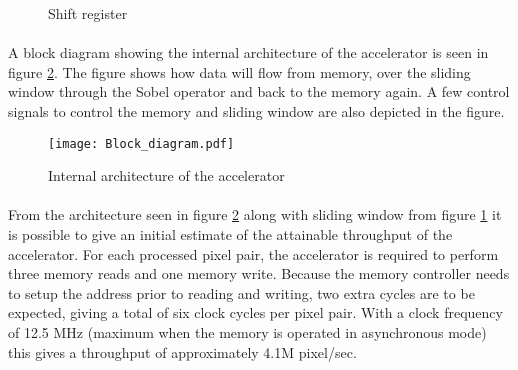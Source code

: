 \begin{figure}[H]
	\centering
	\caption{Shift register}
	\label{fig:shift_register}
\end{figure}

\paragraph*{}
A block diagram showing the internal architecture of the accelerator is seen in figure \ref{fig:AccBlockDiagram}. The figure shows how data will flow from memory, over the sliding window through the Sobel operator and back to the memory again. A few control signals to control the memory and sliding window are also depicted in the figure. 

\begin{figure}[H]
	\centering
	\texttt{[image: Block\_diagram.pdf]}
	\caption{Internal architecture of the accelerator}
	\label{fig:AccBlockDiagram}
\end{figure}

\paragraph*{}
From the architecture seen in figure \ref{fig:AccBlockDiagram} along with sliding window from figure \ref{fig:shift_register} it is possible to give an initial estimate of the attainable throughput of the accelerator. For each processed pixel pair, the accelerator is required to perform three memory reads and one memory write. Because the memory controller needs to setup the address prior to reading and writing, two extra cycles are to be expected, giving a total of six clock cycles per pixel pair.
With a clock frequency of 12.5 MHz (maximum when the memory is operated in asynchronous mode) this gives a throughput of approximately 4.1M pixel/sec.

